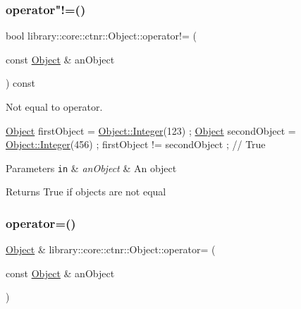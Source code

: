 \mbox{\label{classlibrary_1_1core_1_1ctnr_1_1_object_a8544bc0fbc6db8b12c8dabd51b075aa5}} 
\subsubsection{\texorpdfstring{operator"!=()}{operator!=()}}
{\footnotesize\ttfamily bool library\+::core\+::ctnr\+::\+Object\+::operator!= (\begin{DoxyParamCaption}\item[{const \hyperlink{classlibrary_1_1core_1_1ctnr_1_1_object}{Object} \&}]{an\+Object }\end{DoxyParamCaption}) const}



Not equal to operator. 


\begin{DoxyCode}
\hyperlink{classlibrary_1_1core_1_1ctnr_1_1_object_a51bb72dec3a1b2738e0ad92b977b8d8d}{Object} firstObject = \hyperlink{classlibrary_1_1core_1_1ctnr_1_1_object_a8a8b1ef718d092c154011cf5c37373bb}{Object::Integer}(123) ;
\hyperlink{classlibrary_1_1core_1_1ctnr_1_1_object_a51bb72dec3a1b2738e0ad92b977b8d8d}{Object} secondObject = \hyperlink{classlibrary_1_1core_1_1ctnr_1_1_object_a8a8b1ef718d092c154011cf5c37373bb}{Object::Integer}(456) ;
firstObject != secondObject ; \textcolor{comment}{// True}
\end{DoxyCode}



\begin{DoxyParams}[1]{Parameters}
\mbox{\tt in}  & {\em an\+Object} & An object \\
\hline
\end{DoxyParams}
\begin{DoxyReturn}{Returns}
True if objects are not equal 
\end{DoxyReturn}
\mbox{\label{classlibrary_1_1core_1_1ctnr_1_1_object_a48f26f6297266090793fc53862654122}} 
\subsubsection{\texorpdfstring{operator=()}{operator=()}}
{\footnotesize\ttfamily \hyperlink{classlibrary_1_1core_1_1ctnr_1_1_object}{Object} \& library\+::core\+::ctnr\+::\+Object\+::operator= (\begin{DoxyParamCaption}\item[{const \hyperlink{classlibrary_1_1core_1_1ctnr_1_1_object}{Object} \&}]{an\+Object }\end{DoxyParamCaption})}



